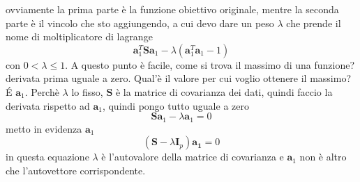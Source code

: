 ovviamente la prima  parte è la funzione obiettivo originale, mentre la seconda parte è il vincolo che sto aggiungendo, a cui devo dare un peso $\lambda$ che prende il nome di moltiplicatore di lagrange
\begin{equation}
 \mathbf{a}_1^T \mathbf{S}\mathbf{a}_1 - \lambda(\mathbf{a}_1^T \mathbf{a}_1  -1)
\end{equation}
con $0 < \lambda \leq 1$. A questo punto è facile, come si trova il massimo di una funzione? derivata prima uguale a zero. Qual'è il valore per cui voglio ottenere il massimo? \'E $\mathbf{a}_1$. Perchè $\lambda$ lo fisso, $\mathbf{S}$ è la matrice di covarianza dei dati, quindi faccio la derivata rispetto ad $\mathbf{a}_1$, quindi pongo tutto uguale a zero
\begin{equation}
\mathbf{S}\mathbf{a}_1 - \lambda \mathbf{a}_1 = 0
\end{equation}
metto in evidenza $\mathbf{a}_1$
\begin{equation}
(\mathbf{S}-\lambda \mathbf{I}_p)\mathbf{a_1} = 0
\end{equation}
in questa equazione $\lambda$ è l'autovalore della matrice di covarianza e $\mathbf{a}_1$ non è altro che l'autovettore corrispondente.\\

